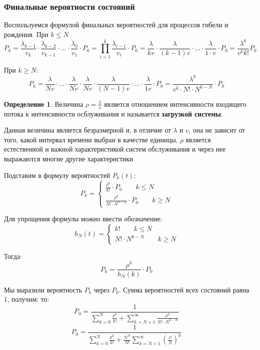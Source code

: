 \documentclass[aps,%
12pt,%
final,%
oneside,
onecolumn,%
musixtex, %
superscriptaddress,%
centertags]{article} %
\theoremstyle{plain}
\theoremstyle{definition}
\newtheorem{definition}{Определение}[subsection]
\theoremstyle{remark}
\begin{document}
\subsubsection{Финальные вероятности состояний}

Воспользуемся формулой финальных вероятностей для процессов гибели и рождения. При $k \leq N$
$$P_k = \frac{\lambda_{k-1}}{v_k} \cdot \frac{\lambda_{k-2}}{v_{k-1}} \cdot \ldots \cdot \frac{\lambda_0}{v_1} \cdot P_0 = \prod_{i=1}^k \frac{\lambda_{i-1}}{v_i} \cdot P_0 = \frac{\lambda}{kv} \cdot \frac{\lambda}{(k-1)v} \cdot \ldots \cdot \frac{\lambda}{1\cdot v} \cdot P_0 = \frac{\lambda^k}{v^k k!} P_0$$

При $k \geq N$:
$$P_k = \frac{\lambda}{Nv} \cdot \ldots \cdot  \frac{\lambda}{Nv} \cdot  \frac{\lambda}{Nv} \cdot  \frac{\lambda}{(N-1)v} \cdot \ldots \cdot  \frac{\lambda}{1v} \cdot P_0 = \frac{\lambda^k}{v^k \cdot N! \cdot N^{k-N}} \cdot P_0$$

\begin{definition}
	Величина $\rho = \frac{\lambda}{v}$ является отношением интенсивности входящего потока к интенсивности осблуживания и называется \textbf{загрузкой системы}.

	Данная величина является безразмерной и, в отличие от $\lambda$ и $v$, она не зависит от того, какой интервал времени выбран в качестве единицы. $\rho$ является естественной и важной характеристикой систем обслуживания и через нее выражаются многие другие характеристики
\end{definition}

Подставим в формулу вероятностей $P_k(t)$:
$$P_k = \begin{cases}
	\frac{\rho^k}{k!} \cdot P_0 \qquad k \leq N\\
	\frac{\rho^k}{N! \cdot N^{k-N}} \cdot P_0 \qquad k \geq N
\end{cases}$$

Для упрощения формулы можно ввести обозначение:
$$h_N(t) = \begin{cases}
	k! \qquad k \leq N \\
	N! \cdot N^{k-N} \qquad k \geq N
\end{cases}$$

Тогда:
$$P_k = \frac{\rho^k}{h_N(k)} \cdot P_0$$

Мы выразили вероятность $P_k$ через $P_0$. Сумма вероятностей всех состояний равна $1$, получим:
то:
$$P_0 = \frac{1}{\sum\limits_{k=0}^N \frac{\rho^k}{k!} + \sum\limits_{k=N+1}^{\infty} \frac{\rho^k}{N! \cdot N^{k-N}}}$$
$$P_0 = \frac{1}{\sum\limits_{k=0}^N \frac{\rho^k}{k!} + \frac{N^N}{N!}\sum\limits_{k=N+1}^{\infty} \left(\frac{\rho}{N}\right)^k}$$
\end{document}
